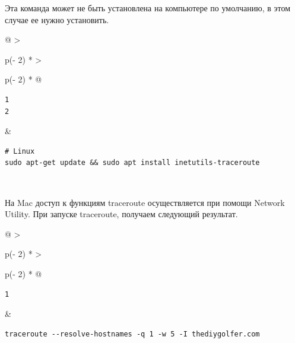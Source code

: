 \documentclass{report}
\begin{document}
Эта команда может не быть установлена на компьютере по умолчанию, в этом
случае ее нужно установить.

\begin{longtable}[]{@{}
  >{\raggedright\arraybackslash}p{(\columnwidth - 2\tabcolsep) * }
  >{\raggedright\arraybackslash}p{(\columnwidth - 2\tabcolsep) * }@{}}
\toprule
\endhead
\begin{minipage}[t]{\linewidth}\raggedright
\begin{verbatim}
1
2
\end{verbatim}
\end{minipage} & \begin{minipage}[t]{\linewidth}\raggedright
\begin{verbatim}
# Linux
sudo apt-get update && sudo apt install inetutils-traceroute
\end{verbatim}
\end{minipage} \\ \addlinespace
\bottomrule
\end{longtable}

На Mac доступ к функциям traceroute осуществляется при помощи Network
Utility. При запуске traceroute, получаем следующий результат.

\begin{longtable}[]{@{}
  >{\raggedright\arraybackslash}p{(\columnwidth - 2\tabcolsep) * }
  >{\raggedright\arraybackslash}p{(\columnwidth - 2\tabcolsep) * }@{}}
\toprule
\endhead
\begin{minipage}[t]{\linewidth}\raggedright
\begin{verbatim}
1
\end{verbatim}
\end{minipage} & \begin{minipage}[t]{\linewidth}\raggedright
\begin{verbatim}
traceroute --resolve-hostnames -q 1 -w 5 -I thediygolfer.com
\end{verbatim}
\end{minipage} \\ \addlinespace
\bottomrule
\end{longtable}
\end{document}
